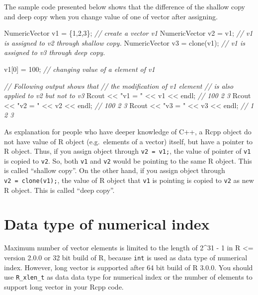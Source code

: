 \documentclass[]{book}
\newenvironment{Shaded}{\begin{snugshade}}{\end{snugshade}}
\newcommand{\CommentTok}[1]{\textcolor[rgb]{0.56,0.35,0.01}{\textit{#1}}}
\newcommand{\DecValTok}[1]{\textcolor[rgb]{0.00,0.00,0.81}{#1}}
\newcommand{\NormalTok}[1]{#1}
\newcommand{\StringTok}[1]{\textcolor[rgb]{0.31,0.60,0.02}{#1}}
\begin{document}
The sample code presented below shows that the difference of the shallow copy and deep copy when you change value of one of vector after assigning.

\begin{Shaded}
\begin{Highlighting}[]
\NormalTok{NumericVector v1 = \{}\DecValTok{1}\NormalTok{,}\DecValTok{2}\NormalTok{,}\DecValTok{3}\NormalTok{\};   }\CommentTok{// create a vector v1}
\NormalTok{NumericVector v2 = v1;        }\CommentTok{// v1 is assigned to v2 through shallow copy.}
\NormalTok{NumericVector v3 = clone(v1); }\CommentTok{// v1 is assigned to v3 through deep copy.}

\NormalTok{v1[}\DecValTok{0}\NormalTok{] = }\DecValTok{100}\NormalTok{; }\CommentTok{// changing value of a element of v1}

\CommentTok{// Following output shows that}
\CommentTok{// the modification of v1 element}
\CommentTok{// is also applied to v2 but not to v3}
\NormalTok{Rcout << }\StringTok{"v1 = "}\NormalTok{ << v1 << endl; }\CommentTok{// 100 2 3}
\NormalTok{Rcout << }\StringTok{"v2 = "}\NormalTok{ << v2 << endl; }\CommentTok{// 100 2 3}
\NormalTok{Rcout << }\StringTok{"v3 = "}\NormalTok{ << v3 << endl; }\CommentTok{// 1 2 3}
\end{Highlighting}
\end{Shaded}

As explanation for people who have deeper knowledge of C++, a Rcpp object do not have value of R object (e.g.~elements of a vector) itself, but have a pointer to R object. Thus, if you assign object through \texttt{v2\ =\ v1;}, the value of pointer of \texttt{v1} is copied to \texttt{v2}. So, both \texttt{v1} and \texttt{v2} would be pointing to the same R object. This is called ``shallow copy''. On the other hand, if you assign object through \texttt{v2\ =\ clone(v1);}, the value of R object that \texttt{v1} is pointing is copied to \texttt{v2} as new R object. This is called ``deep copy''.

\hypertarget{data-type-of-numerical-index}{%
\section{Data type of numerical index}\label{data-type-of-numerical-index}}

Maximum number of vector elements is limited to the length of 2\^{}31 - 1 in R \textless{}= version 2.0.0 or 32 bit build of R, because \texttt{int} is used as data type of numerical index. However, long vector is supported after 64 bit build of R 3.0.0. You should use \texttt{R\_xlen\_t} as data data type for numerical index or the number of elements to support long vector in your Rcpp code.
\end{document}
